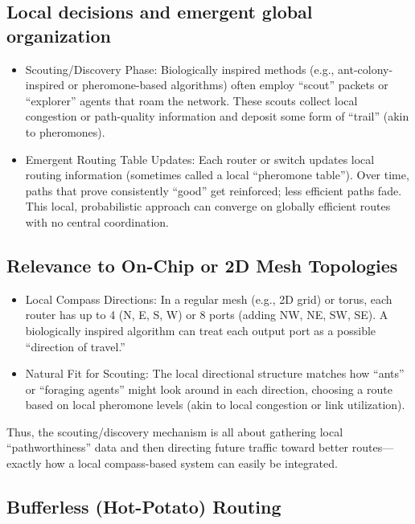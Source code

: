 \documentclass[../OAE-SPEC-MAIN.tex]{subfiles}
\begin{document}
\subsection{Local decisions and emergent global organization}

\begin{itemize}
\item Scouting/Discovery Phase: Biologically inspired methods (e.g., ant-colony-inspired or pheromone-based algorithms) often employ “scout” packets or “explorer” agents that roam the network. These scouts collect local congestion or path-quality information and deposit some form of “trail” (akin to pheromones).
\item Emergent Routing Table Updates: Each router or switch updates local routing information (sometimes called a local “pheromone table”). Over time, paths that prove consistently ``good'' get reinforced; less efficient paths fade. This local, probabilistic approach can converge on globally efficient routes with no central coordination.
\end{itemize}

\subsection{Relevance to On-Chip or 2D Mesh Topologies}

\begin{itemize}
\item Local Compass Directions: In a regular mesh (e.g., 2D grid) or torus, each router has up to 4 (N, E, S, W) or 8 ports (adding NW, NE, SW, SE). A biologically inspired algorithm can treat each output port as a possible ``direction of travel.''
\item Natural Fit for Scouting: The local directional structure matches how “ants” or “foraging agents” might look around in each direction, choosing a route based on local pheromone levels (akin to local congestion or link utilization).
\end{itemize}

Thus, the scouting/discovery mechanism is all about gathering local ``pathworthiness'' data and then directing future traffic toward better routes—exactly how a local compass-based system can easily be integrated.

\subsection{Bufferless (Hot-Potato) Routing}
\end{document}
